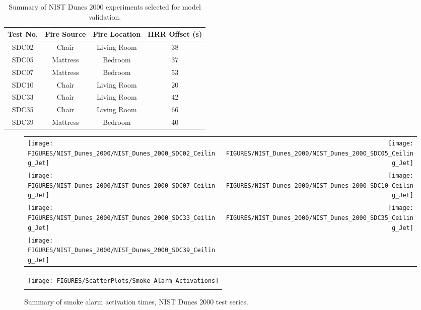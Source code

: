 \begin{table}[h!]
\caption{Summary of NIST Dunes 2000 experiments selected for model validation.}
\begin{center}
\begin{tabular}{|c|c|c|c|}
\hline
Test No.  &  Fire Source  &  Fire Location  &  HRR Offset (s)  \\ \hline \hline
SDC02     &  Chair        &  Living Room    &  38              \\ \hline
SDC05     &  Mattress     &  Bedroom        &  37              \\ \hline
SDC07     &  Mattress     &  Bedroom        &  53              \\ \hline
SDC10     &  Chair        &  Living Room    &  20              \\ \hline
SDC33     &  Chair        &  Living Room    &  42              \\ \hline
SDC35     &  Chair        &  Living Room    &  66              \\ \hline
SDC39     &  Mattress     &  Bedroom        &  40              \\ \hline
\end{tabular}
\end{center}
\label{NIST_Dunes_2000_Summary}
\end{table}

\begin{figure}[p]
\begin{tabular*}{\textwidth}{l@{\extracolsep{\fill}}r}
\texttt{[image: FIGURES/NIST\_Dunes\_2000/NIST\_Dunes\_2000\_SDC02\_Ceiling\_Jet]} &
\texttt{[image: FIGURES/NIST\_Dunes\_2000/NIST\_Dunes\_2000\_SDC05\_Ceiling\_Jet]} \\
\texttt{[image: FIGURES/NIST\_Dunes\_2000/NIST\_Dunes\_2000\_SDC07\_Ceiling\_Jet]} &
\texttt{[image: FIGURES/NIST\_Dunes\_2000/NIST\_Dunes\_2000\_SDC10\_Ceiling\_Jet]} \\
\texttt{[image: FIGURES/NIST\_Dunes\_2000/NIST\_Dunes\_2000\_SDC33\_Ceiling\_Jet]} &
\texttt{[image: FIGURES/NIST\_Dunes\_2000/NIST\_Dunes\_2000\_SDC35\_Ceiling\_Jet]} \\
\texttt{[image: FIGURES/NIST\_Dunes\_2000/NIST\_Dunes\_2000\_SDC39\_Ceiling\_Jet]}
\end{tabular*}
\label{NIST_Dunes_2000_Ceiling_Jet}
\end{figure}

\begin{figure}[p]
\begin{center}
\begin{tabular}{c}
\texttt{[image: FIGURES/ScatterPlots/Smoke\_Alarm\_Activations]} \\
\vspace{0.25in}
\end{tabular}
\end{center}
\caption[Summary of smoke alarm activation times, NIST Dunes 2000 test series.]
{Summary of smoke alarm activation times, NIST Dunes 2000 test series.}
\label{NIST_Dunes_2000_Scatterplot}
\end{figure}

